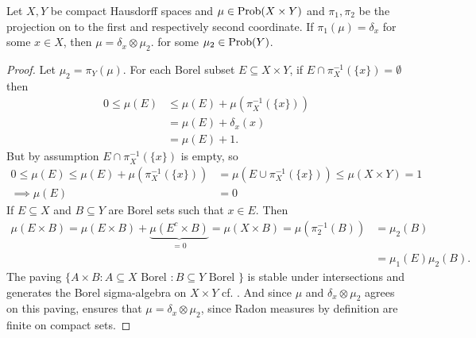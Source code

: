 \begin{lemma}\label{A}
Let $X,Y$ be compact Hausdorff spaces and $\mu \in \operatorname{Prob}(X\times Y)$ and $\pi_1, \pi_2$ be the projection on to the first and respectively second coordinate. If $\pi_1(\mu)=\delta_{x}$ for some $x \in X$, then $\mu= \delta_{x} \otimes \mu_2$. for some $\mu_2 \in \operatorname{Prob}(Y)$.
\begin{proof}
Let $\mu_2=\pi_{Y}(\mu)$. For each Borel subset $E \subseteq X \times Y$, if $E \cap \pi_X^{-1}(\{x\})= \emptyset$ then
\begin{align*}
0 \leq \mu(E) &\leq \mu(E)+\mu(\pi_X^{-1}(\{x\}))\\
&=\mu(E)+\delta_{x}(x)\\
&=\mu(E)+1.
\end{align*}
But by assumption $E \cap \pi_X^{-1}(\{x\})$ is empty, so
\begin{align*}
0 \leq \mu(E) \leq \mu(E)+\mu(\pi_X^{-1}(\{x\})) &= \mu(E \cup \pi_X^{-1}(\{x\})) \leq \mu(X \times Y)=1\\
\implies \mu(E)&=0
\end{align*}
If $E \subseteq X$ and $B\subseteq Y$ are Borel sets such that $x \in E$. Then
\begin{align*}
\mu(E \times B)=\mu(E \times B)+ \underbrace{\mu(E^c \times B)}_{=0} =\mu(X \times B)=\mu(\pi_2^{-1}(B))&=\mu_2(B)\\&=\mu_1(E)\mu_2(B).
\end{align*}
The paving $\{A \times B \colon A \subseteq X \text{ Borel } \colon B \subseteq Y \text{ Borel }\}$  is stable under intersections and generates the Borel sigma-algebra on $X \times Y$ cf. \cite[Theorem 4.22][85]{MI}. And since $\mu$ and $\delta_x \otimes \mu_2$ agrees on this paving, \cite[Theorem 3.8][63]{MI} ensures that $\mu=\delta_{x} \otimes \mu_2$, since Radon measures by definition are finite on compact sets.
\end{proof}
\end{lemma}

